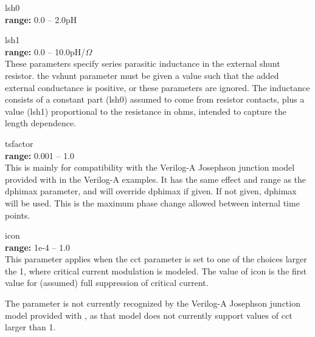 \begin{description}
\item{\vt lsh0}\\
{\bf range:} 0.0 -- 2.0pH
\item{\vt lsh1}\\
{\bf range:} 0.0 -- 10.0pH/${\Omega}$\\
These parameters specify series parasitic inductance in the external
shunt resistor.  the {\vt vshunt} parameter must be given a value such
that the added external conductance is positive, or these parameters
are ignored.  The inductance consists of a constant part ({\vt lsh0})
assumed to come from resistor contacts, plus a value ({\vt lsh1})
proportional to the resistance in ohms, intended to capture the length
dependence.

\item{\vt tsfactor}\\
{\bf range:} 0.001 -- 1.0\\
This is mainly for compatibility with the Verilog-A Josephson junction
model provided with {\WRspice} in the Verilog-A examples.  It has the
same effect and range as the {\WRspice} {\vt dphimax} parameter, and
will override {\vt dphimax} if given.  If not given, {\vt dphimax}
will be used.  This is the maximum phase change allowed between
internal time points.

\item{\vt icon}\\
{\bf range:} 1e-4 -- 1.0\\
This parameter applies when the {\vt cct} parameter is set to one of
the choices larger the 1, where critical current modulation is
modeled.  The value of {\vt icon} is the first value for (assumed)
full suppression of critical current.

The parameter is not currently recognized by the Verilog-A Josephson
junction model provided with {\WRspice}, as that model does not
currently support values of {\vt cct} larger than 1.
\end{description}


